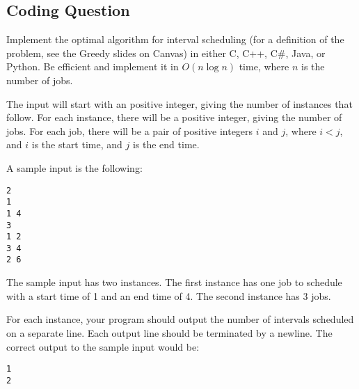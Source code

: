 \documentclass[solutionorbox]{exam}
\begin{document}
\begin{questions}
 
\pagebreak
\section*{Coding Question}
\question
Implement the optimal algorithm for interval scheduling (for a definition of the problem, see the Greedy slides on Canvas) in either C, C++, C\#, Java, or Python. Be efficient and implement it in $O(n \log n)$ time, where $n$ is the number of jobs.

The input will start with an positive integer, giving the number of instances that follow. For each instance, there will be a positive integer, giving the number of jobs. For each job, there will be a pair of positive integers $i$ and $j$, where $i < j$, and $i$ is the start time, and $j$ is the end time.

A sample input is the following:
\begin{verbatim}
2
1
1 4
3
1 2
3 4
2 6
\end{verbatim}
The sample input has two instances. The first instance has one job to schedule with a start time of 1 and an end time of 4. The second instance has 3 jobs.

For each instance, your program should output the number of intervals scheduled on a separate line. Each output line should be terminated by a newline. The correct output to the sample input would be:
\begin{verbatim}
1
2
\end{verbatim}

\end{questions}
\end{document}

